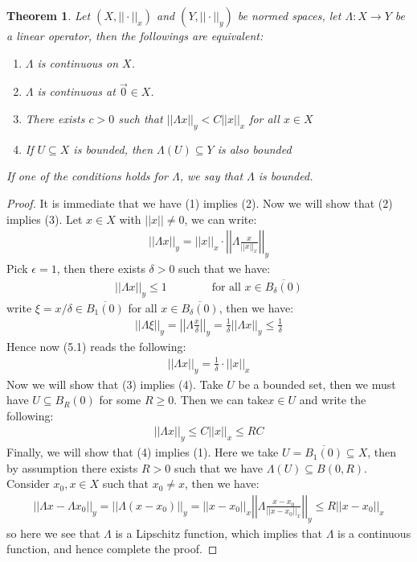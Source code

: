 \documentclass[11pt]{book}
\theoremstyle{break}
\theoremstyle{break}
\newtheorem{thm}{Theorem}[section]
\begin{document}
\begin{thm}
Let $(X,||\cdot ||_x)$ and $(Y,||\cdot||_y)$ be normed spaces, let $\Lambda:X\to Y$ be a linear operator, then the followings are equivalent:
\begin{enumerate}[topsep=3pt,itemsep=-1ex,partopsep=1ex,parsep=1ex]
\item $\Lambda$ is continuous on $X$.
\item $\Lambda$ is continuous at $\vec{0}\in X$. 
\item There exists $c>0$ such that $||\Lambda x||_y < C||x||_x$ for all $x \in X$
\item If $U \subseteq X$ is bounded, then $\Lambda(U) \subseteq Y$ is also bounded
\end{enumerate}
If one of the conditions holds for $\Lambda$, we say that $\Lambda$ is bounded. 
\end{thm}
\begin{proof}
It is immediate that we have (1) implies (2). Now we will show that (2) implies (3). Let $x \in X$ with $||x|| \neq 0$, we can write:
\begin{align}
||\Lambda x||_y = ||x||_x \cdot \left|\left|\Lambda \frac{x}{||x||_x}\right|\right|_y
\end{align}
Pick $\epsilon=1$, then there exists $\delta >0$ such that we have:
\begin{align*}
||\Lambda x||_y \leq 1 \qquad\qquad\text{for all }x\in \overline{B_\delta(0)}
\end{align*}
write $\xi = x/\delta \in \overline{B_1(0)}$ for all $x \in \overline{B_\delta(0)}$, then we have:
\begin{align*}
||\Lambda \xi||_y = \left|\left|\Lambda \frac{x}{\delta}\right|\right|_y = \frac{1}{\delta} ||\Lambda x||_y \leq \frac{1}{\delta}
\end{align*}
Hence now (5.1) reads the following:
\begin{align*}
||\Lambda x||_y = \frac{1}{\delta}\cdot ||x||_x 
\end{align*}
Now we will show that (3) implies (4). Take $U$ be a bounded set, then we must have $U \subseteq B_R(0)$ for some $R \geq 0$. Then we can take$x \in U$ and write the following:
\begin{align*}
||\Lambda x||_y \leq C ||x||_x \leq RC
\end{align*}
Finally, we will show that (4) implies (1). Here we take $U = \overline{B_1(0)} \subseteq X$, then by assumption there exists $R >0$ such that we have $\Lambda(U) \subseteq B(0,R)$. Consider $x_0,x \in X$ such that $x_0 \neq x$, then we have:
\begin{align*}
||\Lambda x - \Lambda x_0||_y = ||\Lambda (x-x_0)||_y = ||x-x_0||_x \left|\left| \Lambda \frac{x-x_0}{||x-x_0||_x}\right|\right|_y \leq R||x-x_0||_x
\end{align*}
so here we see that $\Lambda$ is a Lipschitz function, which implies that $\Lambda$ is a continuous function, and hence complete the proof. 
\end{proof}
\end{document}
